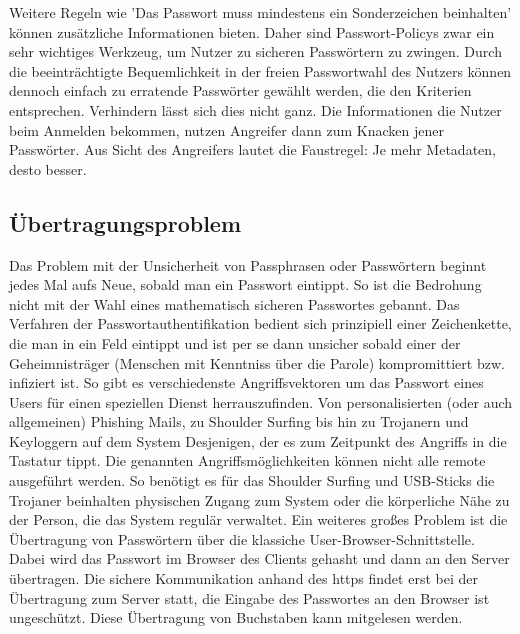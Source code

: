 Weitere Regeln wie 'Das Passwort muss mindestens ein Sonderzeichen beinhalten' können zusätzliche Informationen bieten. Daher sind Passwort-Policys zwar ein sehr wichtiges Werkzeug, um Nutzer zu sicheren Passwörtern zu zwingen. Durch die beeinträchtigte Bequemlichkeit in der freien Passwortwahl des Nutzers können dennoch einfach zu erratende Passwörter gewählt werden, die den Kriterien entsprechen. Verhindern lässt sich dies nicht ganz. Die Informationen die Nutzer beim Anmelden bekommen, nutzen Angreifer dann zum Knacken jener Passwörter. Aus Sicht des Angreifers lautet die Faustregel: Je mehr Metadaten, desto besser.
\newpage

\subsection{Übertragungsproblem}
Das Problem mit der Unsicherheit von Passphrasen oder Passwörtern beginnt jedes Mal aufs Neue, sobald man ein Passwort eintippt. So ist die Bedrohung nicht mit der Wahl eines mathematisch sicheren Passwortes gebannt. Das Verfahren der Passwortauthentifikation bedient sich prinzipiell einer Zeichenkette, die man in ein Feld eintippt und ist per se dann unsicher sobald einer der Geheimnisträger (Menschen mit Kenntniss über die Parole) kompromittiert bzw. infiziert ist. So gibt es verschiedenste Angriffsvektoren um das Passwort eines Users für einen speziellen Dienst herrauszufinden. Von personalisierten (oder auch allgemeinen) Phishing Mails, zu Shoulder Surfing bis hin zu Trojanern und Keyloggern auf dem System Desjenigen, der es zum Zeitpunkt des Angriffs in die Tastatur tippt. Die genannten Angriffsmöglichkeiten können nicht alle remote ausgeführt werden. So benötigt es für das Shoulder Surfing und USB-Sticks die Trojaner beinhalten physischen Zugang zum System oder die körperliche Nähe zu der Person, die das System regulär verwaltet. Ein weiteres großes Problem ist die Übertragung von Passwörtern über die klassiche User-Browser-Schnittstelle. Dabei wird das Passwort im Browser des Clients gehasht und dann an den Server übertragen. Die sichere Kommunikation anhand des \ac{https} findet erst bei der Übertragung zum Server statt, die Eingabe des Passwortes an den Browser ist ungeschützt. Diese Übertragung von Buchstaben kann mitgelesen werden.

